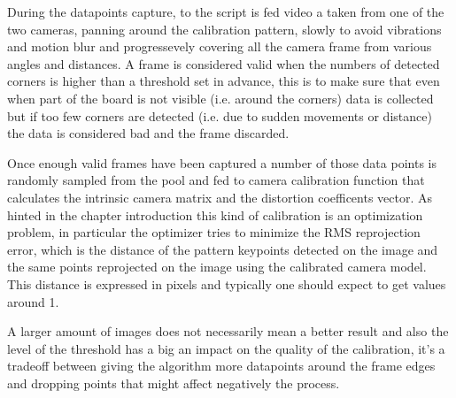 During the datapoints capture, to the script is fed video a taken from one of the two cameras, panning around the calibration pattern, slowly to avoid vibrations and motion blur and progressevely covering all the camera frame from various angles and distances. A frame is considered valid when the numbers of detected corners is higher than a threshold set in advance, this is to make sure that even when part of the board is not visible (i.e. around the corners) data is collected but if too few corners are detected (i.e. due to sudden movements or distance) the data is considered bad and the  frame discarded.

Once enough valid frames have been captured a number of those data points is randomly sampled from the pool and fed to camera calibration function that calculates the intrinsic camera matrix and the distortion coefficents vector. As hinted in the chapter introduction this kind of calibration is an optimization problem, in particular the optimizer tries to minimize the RMS reprojection error, which is the distance of the pattern keypoints detected on the image and the same points reprojected on the image using the calibrated camera model. This distance is expressed in pixels and typically one should expect to get values around 1.

A larger amount of images does not necessarily mean a better result and also the level of the threshold has a big an impact on the quality of the calibration, it's a tradeoff between giving the algorithm more datapoints around the frame edges and dropping points that might affect negatively the process.


